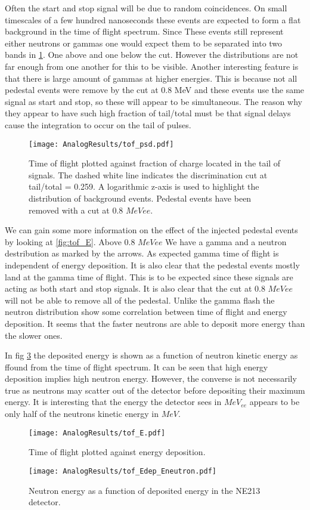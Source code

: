 \documentclass[main.tex]{subfiles}
\begin{document}
Often the start and stop signal will be due to random coincidences. On small timescales of a few hundred nanoseconds these events are expected to form a flat background in the time of flight spectrum. Since These events still represent either neutrons or gammas one would expect them to be separated into two bands in \ref{fig:tof_ps_a}. One above and one below the cut. However the distributions are not far enough from one another for this to be visible.
Another interesting feature is that there is large amount of gammas at higher energies. This is because not all pedestal events were remove by the cut at 0.8 MeV and these events use the same signal as start and stop, so these will appear to be simultaneous. The reason why they appear to have such high fraction of tail/total must be that signal delays cause the integration to occur on the tail of pulses.
\begin{figure}[ht]
    \centering
        \texttt{[image: AnalogResults/tof\_psd.pdf]}
        \caption{Time of flight plotted against fraction of charge located in the tail of signals. The dashed white line indicates the discrimination cut at tail/total = 0.259. A logarithmic z-axis is used to highlight the distribution of background events. Pedestal events have been removed with a cut at 0.8 $MeV{ee}$.}
    \label{fig:tof_ps_a} 
\end{figure}

We can gain some more information on the effect of the injected pedestal events by looking at \ref{fig:tof_E}. Above 0.8 $MeV{ee}$ We have a gamma and a neutron destribution as marked by the arrows. As expected gamma time of flight is independent of energy deposition. It is also clear that the pedestal events mostly land at the gamma time of flight. This is to be expected since these signals are acting as both start and stop signals. It is also clear that the cut at 0.8 $MeV{ee}$ will not be able to remove all of the pedestal. Unlike the gamma flash the neutron distribution show some correlation between time of flight and energy deposition. It seems that the faster neutrons are able to deposit more energy than the slower ones.

In fig \ref{fig:tof_Edep_Eneutron_a} the deposited energy is shown as a function of neutron kinetic energy as ffound from the time of flight spectrum. It can be seen that high energy deposition implies high neutron energy. However, the converse is not necessarily true as neutrons may scatter out of the detector before depositing their maximum energy. It is interesting that the energy the detector sees in $MeV_{ee}$ appears to be only half of the neutrons kinetic energy in  $MeV$.

\begin{figure}[ht]
    \centering
        \texttt{[image: AnalogResults/tof\_E.pdf]}
        \caption{Time of flight plotted against energy deposition.}
    \label{fig:tof_E_a} 
\end{figure}

\begin{figure}[ht]
    \centering
        \texttt{[image: AnalogResults/tof\_Edep\_Eneutron.pdf]}
        \caption{Neutron energy as a function of deposited energy in the NE213 detector.}
    \label{fig:tof_Edep_Eneutron_a} 
\end{figure}
\end{document}
